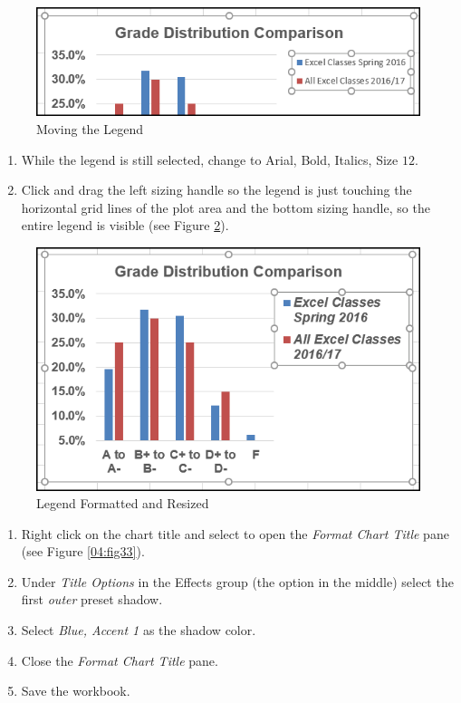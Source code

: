 \begin{figure}[H]
	\centering
	\includegraphics[width=\maxwidth{.95\linewidth}]{gfx/ch04_fig31}
	\caption{Moving the Legend}
	\label{04:fig31}
\end{figure}

\begin{enumerate}[resume]
	\item While the legend is still selected, change  to Arial, Bold, Italics, Size $ 12 $.
	\item Click and drag the left sizing handle so the legend is just touching the horizontal grid lines of the plot area and the bottom sizing handle, so the entire legend is visible (see Figure \ref{04:fig32}).
\end{enumerate}

\begin{figure}[H]
	\centering
	\includegraphics[width=\maxwidth{.95\linewidth}]{gfx/ch04_fig32}
	\caption{Legend Formatted and Resized}
	\label{04:fig32}
\end{figure}

\begin{enumerate}[resume]
	\item Right click on the chart title and select  to open the \textit{Format Chart Title} pane (see Figure \ref{04:fig33}).
	\item Under \textit{Title Options} in the Effects group (the option in the middle) select the first \textit{outer} preset shadow. 
	\item Select \textit{Blue, Accent 1} as the shadow color.
	\item Close the \textit{Format Chart Title} pane.
	\item Save the  workbook.
\end{enumerate}

